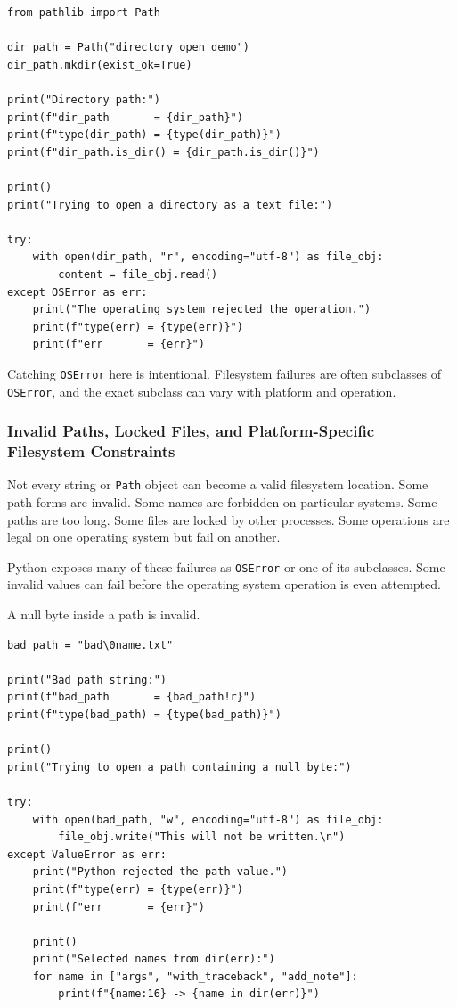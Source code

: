 \begin{verbatim}
from pathlib import Path

dir_path = Path("directory_open_demo")
dir_path.mkdir(exist_ok=True)

print("Directory path:")
print(f"dir_path       = {dir_path}")
print(f"type(dir_path) = {type(dir_path)}")
print(f"dir_path.is_dir() = {dir_path.is_dir()}")

print()
print("Trying to open a directory as a text file:")

try:
    with open(dir_path, "r", encoding="utf-8") as file_obj:
        content = file_obj.read()
except OSError as err:
    print("The operating system rejected the operation.")
    print(f"type(err) = {type(err)}")
    print(f"err       = {err}")
\end{verbatim}

Catching \texttt{OSError} here is intentional. Filesystem failures are often subclasses of \texttt{OSError}, and the exact subclass can vary with platform and operation.

\subsubsection{Invalid Paths, Locked Files, and Platform-Specific Filesystem Constraints}

Not every string or \texttt{Path} object can become a valid filesystem location. Some path forms are invalid. Some names are forbidden on particular systems. Some paths are too long. Some files are locked by other processes. Some operations are legal on one operating system but fail on another.

Python exposes many of these failures as \texttt{OSError} or one of its subclasses. Some invalid values can fail before the operating system operation is even attempted.

A null byte inside a path is invalid.

\begin{verbatim}
bad_path = "bad\0name.txt"

print("Bad path string:")
print(f"bad_path       = {bad_path!r}")
print(f"type(bad_path) = {type(bad_path)}")

print()
print("Trying to open a path containing a null byte:")

try:
    with open(bad_path, "w", encoding="utf-8") as file_obj:
        file_obj.write("This will not be written.\n")
except ValueError as err:
    print("Python rejected the path value.")
    print(f"type(err) = {type(err)}")
    print(f"err       = {err}")

    print()
    print("Selected names from dir(err):")
    for name in ["args", "with_traceback", "add_note"]:
        print(f"{name:16} -> {name in dir(err)}")
\end{verbatim}

